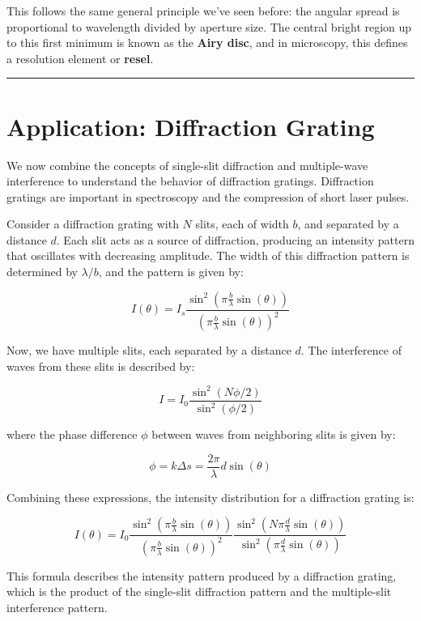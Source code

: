 \documentclass[
  a4paper,
]{book}
\begin{document}
This follows the same general principle we've seen before: the angular
spread is proportional to wavelength divided by aperture size. The
central bright region up to this first minimum is known as the
\textbf{Airy disc}, and in microscopy, this defines a resolution element
or \textbf{resel}.

\begin{center}\rule{0.5\linewidth}{0.5pt}\end{center}

\section{Application: Diffraction
Grating}\label{application-diffraction-grating}

We now combine the concepts of single-slit diffraction and multiple-wave
interference to understand the behavior of diffraction gratings.
Diffraction gratings are important in spectroscopy and the compression
of short laser pulses.

Consider a diffraction grating with \(N\) slits, each of width \(b\),
and separated by a distance \(d\). Each slit acts as a source of
diffraction, producing an intensity pattern that oscillates with
decreasing amplitude. The width of this diffraction pattern is
determined by \(\lambda/b\), and the pattern is given by:

\[
I(\theta) = I_s \frac{\sin^2\left(\pi \frac{b}{\lambda} \sin(\theta)\right)}{\left(\pi \frac{b}{\lambda} \sin(\theta)\right)^2}
\]

Now, we have multiple slits, each separated by a distance \(d\). The
interference of waves from these slits is described by:

\[
I = I_0 \frac{\sin^2(N \phi / 2)}{\sin^2(\phi / 2)}
\]

where the phase difference \(\phi\) between waves from neighboring slits
is given by:

\[
\phi = k \Delta s = \frac{2\pi}{\lambda} d \sin(\theta)
\]

Combining these expressions, the intensity distribution for a
diffraction grating is:

\[
I(\theta) = I_0 \frac{\sin^2\left(\pi \frac{b}{\lambda} \sin(\theta)\right)}{\left(\pi \frac{b}{\lambda} \sin(\theta)\right)^2} \frac{\sin^2\left(N \pi \frac{d}{\lambda} \sin(\theta)\right)}{\sin^2\left(\pi \frac{d}{\lambda} \sin(\theta)\right)}
\]

This formula describes the intensity pattern produced by a diffraction
grating, which is the product of the single-slit diffraction pattern and
the multiple-slit interference pattern.
\end{document}
